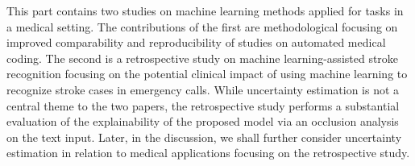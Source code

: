 


 
This part contains two studies on machine learning methods applied for tasks in a medical setting. The contributions of the first are methodological focusing on improved comparability and reproducibility of studies on automated medical coding. The second is a retrospective study on machine learning-assisted stroke recognition focusing on the potential clinical impact of using machine learning to recognize stroke cases in emergency calls. 
While uncertainty estimation is not a central theme to the two papers, the retrospective study performs a substantial evaluation of the explainability of the proposed model via an occlusion analysis on the text input. 
Later, in the discussion, we shall further consider uncertainty estimation in relation to medical applications focusing on the retrospective study.

